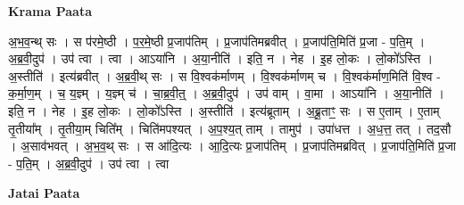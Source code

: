\documentclass[17pt]{extarticle}
\begin{document}
\textbf{Krama Paata} \newline

अ॒भ॒व॒न्थ् सः । स प॑रमे॒ष्ठी । प॒र॒मे॒ष्ठी प्र॒जाप॑तिम् । प्र॒जाप॑तिमब्रवीत् । प्र॒जाप॑ति॒मिति॑ प्र॒जा - प॒ति॒म् । अ॒ब्र॒वी॒दुप॑ । उप॑ त्वा । त्वा । आऽया॑नि । अ॒या॒नीति॑ । इति॒ न । नेह । इ॒ह लो॒कः । लो॒को᳚ऽस्ति । अ॒स्तीति॑ । इत्य॑ब्रवीत् । अ॒ब्र॒वी॒थ् सः । स वि॒श्वक॑र्माणम् । वि॒श्वक॑र्माणम् च । वि॒श्वक॑र्माण॒मिति॑ वि॒श्व - क॒र्मा॒ण॒म् । च॒ य॒ज्ञ्म् । य॒ज्ञ्म् च॑ । चा॒ब्र॒वी॒त्॒ । अ॒ब्र॒वी॒दुप॑ । उप॑ वाम् । वा॒मा । आऽया॑नि । अ॒या॒नीति॑ । इति॒ न । नेह । इ॒ह लो॒कः । लो॒को᳚ऽस्ति । अ॒स्तीति॑ । इत्य॑ब्रूताम् । अ॒ब्रू॒ताꣳ॒॒ सः । स ए॒ताम् । ए॒ताम् तृ॒तीया᳚म् । तृ॒तीया॒म् चिति᳚म् । चिति॑मपश्यत् । अ॒प॒श्य॒त् ताम् । तामुप॑ । उपा॑धत्त । अ॒ध॒त्त॒ तत् । तद॒सौ । अ॒साव॑भवत् । अ॒भ॒व॒थ् सः । स आ॑दि॒त्यः । आ॒दि॒त्यः प्र॒जाप॑तिम् । प्र॒जाप॑तिमब्रवित् । प्र॒जाप॑ति॒मिति॑ प्र॒जा - प॒ति॒म् । अ॒ब्र॒वी॒दुप॑ । उप॑ त्वा । त्वा \newline

\textbf{Jatai Paata} \newline
\end{document}
